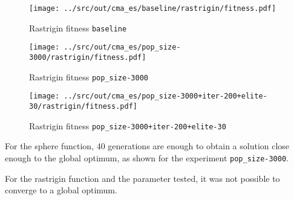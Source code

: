 \begin{figure}[H]
	\centering
	\begin{minipage}[b]{.6\textwidth}
		\texttt{[image: ../src/out/cma\_es/baseline/rastrigin/fitness.pdf]}	
	\end{minipage}
	\caption{Rastrigin fitness \texttt{baseline}}
	\label{fig:cmaes-r-fitness/baseline}

	\begin{minipage}[b]{.6\textwidth}
		\texttt{[image: ../src/out/cma\_es/pop\_size-3000/rastrigin/fitness.pdf]}	
	\end{minipage}
	\caption{Rastrigin fitness \texttt{pop\_size-3000}}
	\label{fig:cmaes-r-fitness/3000}
	
		\begin{minipage}[b]{.6\textwidth}
		\texttt{[image: ../src/out/cma\_es/pop\_size-3000+iter-200+elite-30/rastrigin/fitness.pdf]}	
	\end{minipage}
	\caption{Rastrigin fitness \texttt{pop\_size-3000+iter-200+elite-30}}
	\label{fig:cmaes-r-fitness/3000iter}
\end{figure}


For the sphere function, 40 generations are enough to obtain a solution close enough to the global optimum, as shown for the experiment \texttt{pop\_size-3000}.

For the rastrigin function and the parameter tested, it was not possible to converge to a global optimum. 